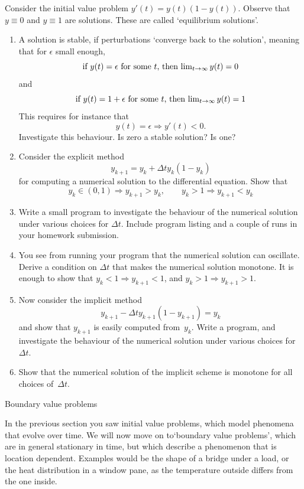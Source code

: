 \begin{exercise}
  Consider the initial value problem $y'(t)=y(t)(1-y(t))$.
Observe that $y\equiv 0$ and $y\equiv 1$ are solutions. These are called `equilibrium solutions'.
\begin{enumerate}
\item A solution is stable, if perturbations `converge back to the
  solution', meaning that for $\epsilon$ small enough,
  \[ \hbox{if  $y(t)=\epsilon$ for some~$t$, then
    $\lim_{t\rightarrow\infty}y(t)=0$} \]
  and
  \[ \hbox{if  $y(t)=1+\epsilon$ for some~$t$, then
    $\lim_{t\rightarrow\infty}y(t)=1$} \]
  This requires for instance that \[ y(t)=\epsilon\Rightarrow y'(t)<0. \]
  Investigate this behaviour. Is zero a stable solution? Is one?
\item Consider the explicit method 
  \[ y_{k+1}=y_k+\Delta t y_k(1-y_k) \]
  for computing a numerical solution
  to the differential equation. Show that
  \[ y_k\in(0,1)\Rightarrow y_{k+1}>y_k,\qquad
     y_k>1\Rightarrow y_{k+1}<y_k \]
\item Write a small program to investigate the behaviour of the
  numerical solution under various choices for $\Delta t$. Include
  program listing and a couple of runs in your homework submission.
\item You see from running your program that the numerical solution
  can oscillate. Derive a condition on $\Delta t$ that makes the
  numerical solution monotone. It is enough to show that
  $y_k<1\Rightarrow y_{k+1}<1$, and $y_k>1\Rightarrow y_{k+1}>1$.
\item Now consider the implicit method
  \[ y_{k+1}-\Delta t y_{k+1}(1-y_{k+1})=y_k \]
  and show that $y_{k+1}$ is
  easily computed from~$y_k$. Write a program, and investigate the
  behaviour of the numerical solution under various choices
  for~$\Delta t$.
\item Show that the numerical solution of the implicit scheme is
  monotone for all choices of~$\Delta t$.
\end{enumerate}
\end{exercise}



 {Boundary value problems}
\label{sec:bvp}

In the previous section you saw initial value problems, which model
phenomena that evolve over time. We will now move on to`boundary value
problems', which are in general stationary in time, but which describe
a phenomenon that is location dependent. Examples would be the shape
of a bridge under a load, or the heat distribution in a window pane,
as the temperature outside differs from the one inside.

